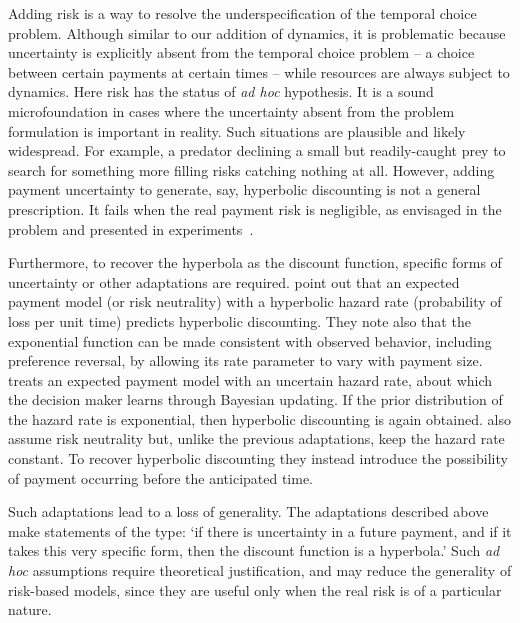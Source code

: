 Adding risk is a way to resolve the underspecification of the temporal choice problem. Although similar to our addition of dynamics, it is problematic because uncertainty is explicitly absent from the temporal choice problem -- a choice between certain payments at certain times -- while resources are always subject to dynamics. Here risk has the status of {\it ad hoc} hypothesis. It is a sound microfoundation in cases where the uncertainty absent from the problem formulation is important in reality. Such situations are plausible and likely widespread. For example, a predator declining a small but readily-caught prey to search for something more filling risks catching nothing at all. However, adding payment uncertainty to generate, say, hyperbolic discounting is not a general prescription. It fails when the real payment risk is negligible, as envisaged in the problem and presented in experiments~\citep[and references therein]{MyersonGreen1995}.

Furthermore, to recover the hyperbola as the discount function, specific forms of uncertainty or other adaptations are required. \citet{GreenMyerson1996} point out that an expected payment model (or risk neutrality) with a hyperbolic hazard rate (probability of loss per unit time) predicts hyperbolic discounting. They note also that the exponential function can be made consistent with observed behavior, including preference reversal, by allowing its rate parameter to vary with payment size. \citet{Sozou1998} treats an expected payment model with an uncertain hazard rate, about which the decision maker learns through Bayesian updating. If the prior distribution of the hazard rate is exponential, then hyperbolic discounting is again obtained. \citet{dasgupta2005uncertainty} also assume risk neutrality but, unlike the previous adaptations, keep the hazard rate constant. To recover hyperbolic discounting they instead introduce the possibility of payment occurring before the anticipated time.

Such adaptations lead to a loss of generality. The adaptations described above make statements of the type: `if there is uncertainty in a future payment, and if it takes this very specific form, then the discount function is a hyperbola.' Such {\it ad hoc} assumptions require theoretical justification, and may reduce the generality of risk-based models, since they are useful only when the real risk is of a particular nature.

